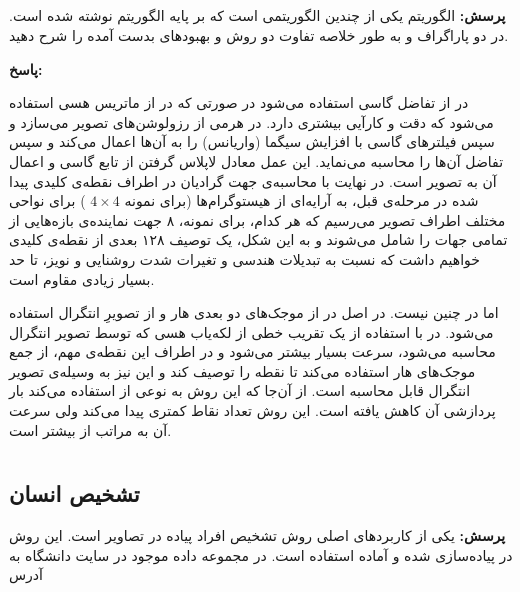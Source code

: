 \documentclass[12pt,a4paper]{article}
\theoremstyle{definition}
\theoremstyle{theorem}
\theoremstyle{definition}
\begin{document}
\subsection{}
\textbf{پرسش: }
الگوریتم  یکی از چندین الگوریتمی است که بر پایه الگوریتم  نوشته شده است. در دو پاراگراف و به طور خلاصه تفاوت دو روش و بهبودهای بدست آمده را شرح دهید.

\textbf{پاسخ: } 

در  از تفاضل‌‌ گاسی استفاده می‌شود در صورتی که در  از ماتریس هسی استفاده می‌شود که دقت و کارآیی بیشتری دارد. در  هرمی از رزولوشن‌های تصویر می‌سازد و سپس فیلترهای گاسی با افزایش سیگما (واریانس) را به آن‌ها اعمال می‌کند و سپس تفاضل آن‌ها را محاسبه می‌نماید. این عمل معادل لاپلاس گرفتن از تابع گاسی و اعمال آن به تصویر است. در نهایت با محاسبه‌ی جهت گرادیان در اطراف نقطه‌ی کلیدی پیدا شده در مرحله‌ی قبل، به آرایه‌ای از هیستوگرام‌ها (برای نمونه
\( 4 \times 4 \)
)
 برای نواحی مختلف اطراف تصویر می‌رسیم که هر کدام، برای نمونه، ۸ جهت نماینده‌ی بازه‌هایی از تمامی جهات را شامل می‌شوند و به این شکل، یک توصیف ۱۲۸ بعدی از نقطه‌ی کلیدی خواهیم داشت که نسبت به تبدیلات هندسی و تغیرات شدت روشنایی و نویز، تا حد بسیار زیادی مقاوم است.

اما در  چنین نیست. در اصل در  از موجک‌های دو بعدی هار و از تصویرِ انتگرال استفاده می‌شود. 
در  با استفاده از یک تقریب خطی از لکه‌یاب هسی که توسط تصویر انتگرال محاسبه می‌شود، سرعت بسیار بیشتر می‌شود و در اطراف این نقطه‌ی مهم، از جمع موجک‌های هار استفاده می‌کند تا نقطه را توصیف کند و این نیز به وسیله‌ی تصویر انتگرال قابل محاسبه‌ است. از آن‌جا که این روش به نوعی از  استفاده می‌کند بار پردازشی آن کاهش یافته است. این روش تعداد نقاط کمتری پیدا می‌کند ولی سرعت آن به مراتب از  بیشتر است.

\section{}

\subsection{تشخیص انسان}

\textbf{پرسش: }
یکی از کاربردهای اصلی روش  تشخیص افراد پیاده در تصاویر است. این روش در  پیاده‌سازی شده و آماده استفاده است. در مجموعه داده موجود در سایت دانشگاه  به آدرس
\end{document}
